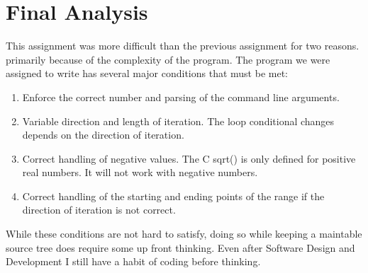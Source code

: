 \documentclass[letterpaper,oneside]{scrartcl}
\begin{document}
\section{Final Analysis}
This assignment was more difficult than the previous assignment for two reasons.
primarily because of the complexity of the program. The program we were assigned
to write has several major conditions that must be met:
\begin{enumerate}
\item Enforce the correct number and parsing of the command line arguments.
\item Variable direction and length of iteration. The loop conditional changes
depends on the direction of iteration.
\item Correct handling of negative values. The C sqrt() is only defined for
positive real numbers. It will not work with negative numbers.
\item Correct handling of the starting and ending points of the range if the 
direction of iteration is not correct. 
\end{enumerate}
While these conditions are not hard to satisfy, doing so while keeping a maintable
source tree does require some up front thinking. Even after Software Design and
Development I still have a habit of coding before thinking.
\end{document}
